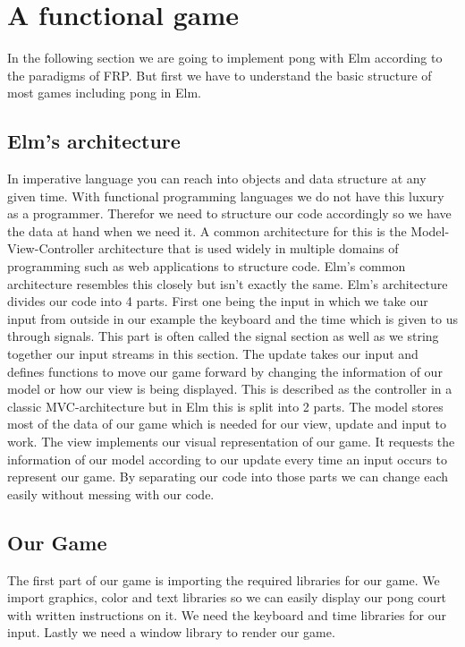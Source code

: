 \documentclass[pdftex,a4paper]{extarticle}
\begin{document}
\section{A functional game}
\label{sec:game}
In the following section we are going to implement pong with Elm according to the paradigms of FRP.
But first we have to understand the basic structure of most games including pong in Elm.
\subsection{Elm's architecture}
In imperative language you can reach into objects and data structure at any given time.
With functional programming languages we do not have this luxury as a programmer.
Therefor we need to structure our code accordingly so we have the data at hand when we need it.
A common architecture for this is the Model-View-Controller architecture\cite{wiki-mvc} that is used widely in multiple domains of programming such as web applications to structure code. 
Elm's common architecture\cite{elm-mvc} resembles this closely but isn't exactly the same.
Elm's architecture divides our code into 4 parts.
First one being the input in which we take our input from outside in our example the keyboard and the time which is given to us through signals.
This part is often called the signal section as well as we string together our input streams in this section.
The update takes our input and defines functions to move our game forward by changing the information of our model or how our view is being displayed.
This is described as the controller in a classic MVC-architecture but in Elm this is split into 2 parts.
The model stores most of the data of our game which is needed for our view, update and input to work.
The view implements our visual representation of our game.
It requests the information of our model according to our update every time an input occurs to represent our game.
By separating our code into those parts we can change each easily without messing with our code.
\subsection{Our Game}
The first part of our game is importing the required libraries for our game.
We import graphics, color and text libraries so we can easily display our pong court with written instructions on it.
We need the keyboard and time libraries for our input.
Lastly we need a window library to render our game. 
\inputminted [breaklines=true] {haskell}{pong(1).hs}
\end{document}
